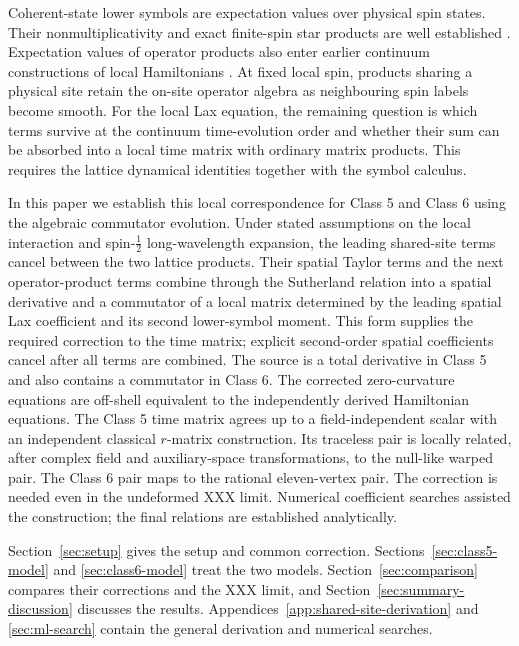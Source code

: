 Coherent-state lower symbols are expectation values over physical spin states.
Their nonmultiplicativity and exact finite-spin star products are well established \cite{Perelomov1986,KoczorZeierGlaser2019}.
Expectation values of operator products also enter earlier continuum
constructions of local Hamiltonians \cite{AvanDoikouSfetsos2010}.
At fixed local spin, products sharing a physical site retain the on-site
operator algebra as neighbouring spin labels become smooth.  For the local
Lax equation, the remaining question is which terms survive at the continuum
time-evolution order and whether their sum can be absorbed into a local time
matrix with ordinary matrix products.  This requires the lattice dynamical
identities together with the symbol calculus.

In this paper we establish this local correspondence for Class 5 and Class 6
using the algebraic commutator evolution.  Under stated assumptions on the
local interaction and spin-$\tfrac12$ long-wavelength expansion, the leading
shared-site terms cancel between the two lattice products.  Their spatial
Taylor terms and the next operator-product terms combine through the
Sutherland relation into a spatial derivative and a commutator of a local
matrix determined by the leading spatial Lax coefficient and its second
lower-symbol moment.  This form supplies the required correction to the time
matrix; explicit second-order spatial coefficients cancel after all terms are
combined.  The source is a total derivative in Class 5 and also contains a
commutator in Class 6.  The corrected zero-curvature equations are off-shell
equivalent to the independently derived Hamiltonian equations.  The Class 5 time matrix agrees up to a field-independent scalar with an
independent classical $r$-matrix construction.  Its traceless pair is locally
related, after complex field and auxiliary-space transformations, to the
null-like warped pair.  The Class 6 pair maps to the rational eleven-vertex pair.  The
correction is needed even in the undeformed XXX limit.  Numerical coefficient
searches \cite{KrippendorfLustSyvaeri2021} assisted the construction; the
final relations are established analytically.

Section~\ref{sec:setup} gives the setup and common correction.
Sections~\ref{sec:class5-model} and \ref{sec:class6-model} treat the two
models.  Section~\ref{sec:comparison} compares their corrections and the XXX
limit, and Section~\ref{sec:summary-discussion} discusses the results.
Appendices~\ref{app:shared-site-derivation} and \ref{sec:ml-search} contain
the general derivation and numerical searches.

